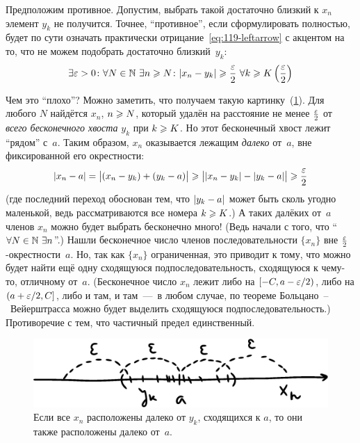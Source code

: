 \documentclass[a4paper,12pt]{article}
\begin{document}
\begin{solution}
    Предположим противное.
    Допустим, выбрать такой достаточно близкий к $x_n$ элемент $y_k$ не получится.
    Точнее, ``противное'', если сформулировать полностью, будет по сути означать практически отрицание~\eqref{eq:119-leftarrow} с акцентом на то, что не можем подобрать достаточно близкий~$y_k$:
    \[
      \exists \eps > 0\colon \forall N \in \NN\ \exists n \geq N\colon |x_n - y_k| \geq \frac{\eps}{2}\ \forall k \hm\geq K\left(\frac{\eps}{2}\right)
    \]
    
    Чем это ``плохо''?
    Можно заметить, что получаем такую картинку~(\ref{fig:far-from-all-yk}).
    Для любого $N$ найдётся $x_n$, $n \hm\geq N$, который удалён на расстояние не менее $\frac{\varepsilon}{2}$ от \emph{всего бесконечного хвоста} $y_k$ при $k \hm\geq K$.
    Но этот бесконечный хвост лежит ``рядом'' с~$a$.
    Таким образом, $x_n$ оказывается лежащим \emph{далеко} от~$a$, вне фиксированной его окрестности:
    \[
      |x_n - a| = \bigl|(x_n - y_k) + (y_k - a)\bigr|
        \geqslant \bigl||x_n - y_k| - |y_k - a|\bigr| \geqslant \frac{\varepsilon}{2}
    \]
    (где последний переход обоснован тем, что $|y_k \hm- a|$ может быть сколь угодно маленькой, ведь рассматриваются все номера $k \hm\geq K$.)
    А таких далёких от~$a$ членов $x_n$ можно будет выбрать бесконечно много!
    (Ведь начали с того, что ``$\forall N \hm\in \NN\ \exists n$''.)
    Нашли бесконечное число членов последовательности $\{x_n\}$ вне $\frac{\varepsilon}{2}$-окрестности~$a$.
    Но, так как $\{x_n\}$ ограниченная, это приводит к тому, что можно будет найти ещё одну сходящуюся подпоследовательность, сходящуюся к чему-то, отличному от~$a$.
    (Бесконечное число $x_n$ лежит либо на $[-C, a \hm- \eps \hm/ 2)$, либо на $(a \hm+ \eps \hm/ 2, C]$, либо и там, и там~---~в любом случае, по теореме Больцано~--~Вейерштрасса можно будет выделить сходящуюся подпоследовательность.)
    Противоречие с тем, что частичный предел единственный.
    
    \begin{figure}[ht]
      \centering
      \includegraphics[width=0.6\linewidth]{images/far-from-all-yk}
      
      \caption{
        Если все $x_n$ расположены далеко от $y_k$, сходящихся к $a$, то они также расположены далеко от~$a$.
      }
      \label{fig:far-from-all-yk}
    \end{figure}
        

\end{solution}
\end{document}
